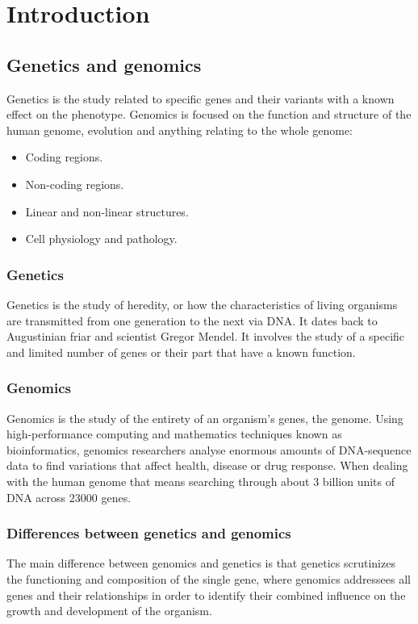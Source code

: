 \graphicspath{{chapters/notes/01/images/}}
\chapter{Introduction}

\section{Genetics and genomics}
Genetics is the study related to specific genes and their variants with a known effect on the phenotype.
Genomics is focused on the function and structure of the human genome, evolution and anything relating to the whole genome:

\begin{multicols}{2}
	\begin{itemize}
		\item Coding regions.
		\item Non-coding regions.
		\item Linear and non-linear structures.
		\item Cell physiology and pathology.
	\end{itemize}
\end{multicols}

	\subsection{Genetics}
	Genetics is the study of heredity, or how the characteristics of living organisms are transmitted from one generation to the next via DNA.
	It dates back to Augustinian friar and scientist Gregor Mendel.
	It involves the study of a specific and limited number of genes or their part that have a known function.

	\subsection{Genomics}
	Genomics is the study of the entirety of an organism's genes, the genome.
	Using high-performance computing and mathematics techniques known as bioinformatics, genomics researchers analyse enormous amounts of DNA-sequence data to find variations that affect health, disease or drug response.
	When dealing with the human genome that means searching through about $3$ billion units of DNA across $23000$ genes.

	\subsection{Differences between genetics and genomics}
	The main difference between genomics and genetics is that genetics scrutinizes the functioning and composition of the single gene, where genomics addressees all genes and their relationships in order to identify their combined influence on the growth and development of the organism.

